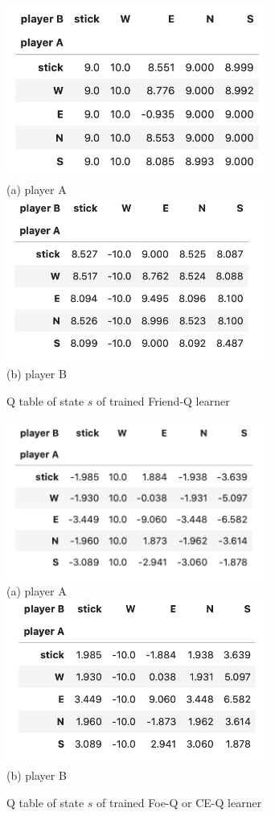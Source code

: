\documentclass[conference]{IEEEtran}
\begin{document}
\begin{figure}
	\centering
	\includegraphics[width=3.4in]{figures/friendQ_A.png}\\
	(a) player A\\
	\includegraphics[width=3.4in]{figures/friendQ_B.png}\\
	(b) player B
	\caption{Q table of state $s$ of trained Friend-Q learner}
	\label{fig:friendQ}
\end{figure}


\begin{figure}
	\centering
	\includegraphics[width=3.4in]{figures/foeQ_A.png}\\
	(a) player A\\
	\includegraphics[width=3.4in]{figures/foeQ_B.png}\\
	(b) player B
	\caption{Q table of state $s$ of trained Foe-Q or CE-Q learner}
	\label{fig:foe-ce-Q}
\end{figure}
\end{document}
